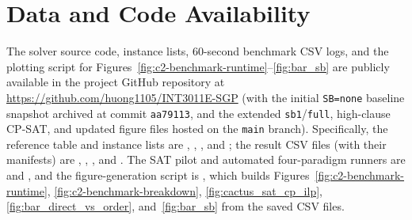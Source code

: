 \documentclass[a4paper,fleqn]{cas-sc}
\begin{document}
\section*{Data and Code Availability}
The solver source code, instance lists, 60-second benchmark CSV logs, and the plotting script for Figures~\ref{fig:c2-benchmark-runtime}--\ref{fig:bar_sb} are publicly available in the project GitHub repository at \url{https://github.com/huong1105/INT3011E-SGP} (with the initial \texttt{SB=none} baseline snapshot archived at commit \texttt{aa79113}, and the extended \texttt{sb1}/\texttt{full}, high-clause CP-SAT, and updated figure files hosted on the \texttt{main} branch).
Specifically, the reference table and instance lists are , , , and ; the result CSV files (with their  manifests) are , , , and .
The SAT pilot and automated four-paradigm runners are  and , and the figure-generation script is , which builds Figures~\ref{fig:c2-benchmark-runtime}, \ref{fig:c2-benchmark-breakdown}, \ref{fig:cactus_sat_cp_ilp}, \ref{fig:bar_direct_vs_order}, and~\ref{fig:bar_sb} from the saved CSV files.
\end{document}
